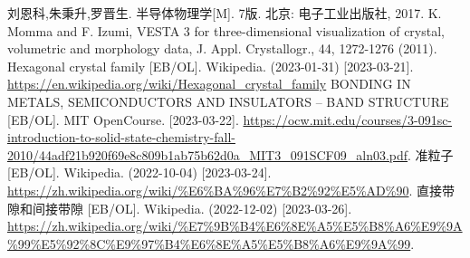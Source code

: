 \begin{thebibliography}{99}%
     刘恩科,朱秉升,罗晋生. 半导体物理学[M]. 7版. 北京: 电子工业出版社, 2017.
     K. Momma and F. Izumi, VESTA 3 for three-dimensional visualization of crystal, volumetric and morphology data, J. Appl. Crystallogr., 44, 1272-1276 (2011).
     Hexagonal crystal family [EB/OL]. Wikipedia. (2023-01-31) [2023-03-21].\\ \url{https://en.wikipedia.org/wiki/Hexagonal_crystal_family}
     BONDING IN METALS, SEMICONDUCTORS AND
    INSULATORS – BAND STRUCTURE [EB/OL]. MIT OpenCourse. [2023-03-22]. \url{https://ocw.mit.edu/courses/3-091sc-introduction-to-solid-state-chemistry-fall-2010/44adf21b920f69e8c809b1ab75b62d0a_MIT3_091SCF09_aln03.pdf}.
     准粒子 [EB/OL]. Wikipedia. (2022-10-04) [2023-03-24].\\ \url{https://zh.wikipedia.org/wiki/%E6%BA%96%E7%B2%92%E5%AD%90}.
     直接带隙和间接带隙 [EB/OL]. Wikipedia. (2022-12-02) [2023-03-26].\\ \url{https://zh.wikipedia.org/wiki/%E7%9B%B4%E6%8E%A5%E5%B8%A6%E9%9A%99%E5%92%8C%E9%97%B4%E6%8E%A5%E5%B8%A6%E9%9A%99}.
\end{thebibliography}
